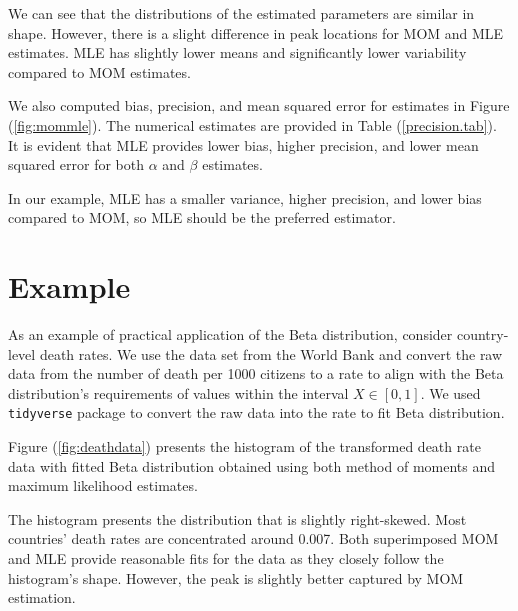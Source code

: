\documentclass{article}\usepackage[]{graphicx}\usepackage[]{xcolor}
\begin{document}
\begin{multicols}{2}
We can see that the distributions of the estimated parameters are similar in shape. However, there is a slight difference in peak locations for MOM and MLE estimates. MLE has slightly lower means and significantly lower variability compared to MOM estimates.

We also computed bias, precision, and mean squared error for estimates in Figure (\ref{fig:mommle}). The numerical estimates are provided in Table (\ref{precision.tab}). It is evident that MLE provides lower bias, higher precision, and lower mean squared error for both $\alpha$ and $\beta$ estimates.

In our example, MLE has a smaller variance, higher precision, and lower bias compared to MOM, so MLE should be the preferred estimator.


\section{Example}\label{sec:examp}
As an example of practical application of the Beta distribution, consider country-level death rates. We use the data set from the World Bank and convert the raw data from the number of death per 1000 citizens to a rate to align with the Beta distribution's requirements of values within the interval $X \in [0,1]$. We used \texttt{tidyverse} package \citep{tidyverse} to convert the raw data into the rate to fit Beta distribution.

Figure (\ref{fig:deathdata}) presents the histogram of the transformed death rate data with fitted Beta distribution obtained using both method of moments and maximum likelihood estimates. 

The histogram presents the distribution that is slightly right-skewed. Most countries' death rates are concentrated around 0.007. Both superimposed MOM and MLE provide reasonable fits for the data as they closely follow the histogram's shape. However, the peak is slightly better captured by MOM estimation.


\end{multicols}
\end{document}
